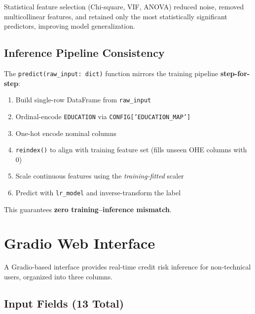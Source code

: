\documentclass[12pt,a4paper]{article}
\begin{document}
Statistical feature selection (Chi-square, VIF, ANOVA) reduced noise,
removed multicollinear features, and retained only the most statistically
significant predictors, improving model generalization.

\subsection{Inference Pipeline Consistency}

\begin{keybox}
  The \texttt{predict(raw\_input: dict)} function mirrors the training
  pipeline \textbf{step-for-step}:
  \begin{enumerate}
    \item Build single-row DataFrame from \texttt{raw\_input}
    \item Ordinal-encode \texttt{EDUCATION} via \texttt{CONFIG['EDUCATION\_MAP']}
    \item One-hot encode nominal columns
    \item \texttt{reindex()} to align with training feature set
          (fills unseen OHE columns with 0)
    \item Scale continuous features using the \emph{training-fitted} scaler
    \item Predict with \texttt{lr\_model} and inverse-transform the label
  \end{enumerate}
  This guarantees \textbf{zero training--inference mismatch}.
\end{keybox}

\newpage

\section{Gradio Web Interface}

A Gradio-based interface provides real-time credit risk inference for
non-technical users, organized into three columns.

\subsection{Input Fields (13 Total)}
\end{document}

